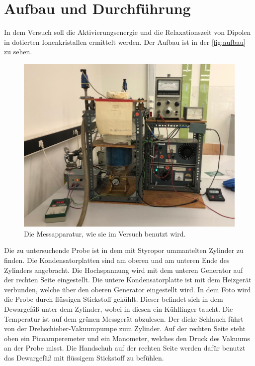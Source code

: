 \section{Aufbau und Durchführung}
\label{sec:Durchführung}

    \noindent In dem Versuch soll die Aktivierungsenergie und die Relaxationszeit von Dipolen in dotierten Ionenkristallen ermittelt werden. 
    Der Aufbau ist in der \autoref{fig:aufbau} zu sehen. 
    \begin{figure}[h]
        \centering
        \includegraphics[width=\textwidth]{bilder/foto_aufbau.png}
        \caption{Die Messapparatur, wie sie im Versuch benutzt wird. \cite{anleitung}}
        \label{fig:aufbau}
    \end{figure}
    Die zu untersuchende Probe ist in dem mit Styropor ummantelten Zylinder zu finden. Die Kondensatorplatten sind am oberen und am unteren Ende des Zylinders 
    angebracht. Die Hochspannung wird mit dem unteren Generator auf der rechten Seite eingestellt. Die untere Kondensatorplatte ist mit dem Heizgerät verbunden, welche über den 
    oberen Generator eingestellt wird. In dem Foto wird die Probe durch flüssigen Stickstoff gekühlt. Dieser befindet sich in dem Dewargefäß unter dem Zylinder, wobei 
    in diesen ein Kühlfinger taucht. Die Temperatur ist auf dem grünen Messgerät abzulesen. Der dicke Schlauch führt von der Drehschieber-Vakuumpumpe 
    zum Zylinder. Auf der rechten Seite steht oben ein Picoamperemeter und ein Manometer, welches den Druck des Vakuums an der Probe misst. 
    Die Handschuh auf der rechten Seite werden dafür benutzt das Dewargefäß mit flüssigem Stickstoff zu befühlen. 

